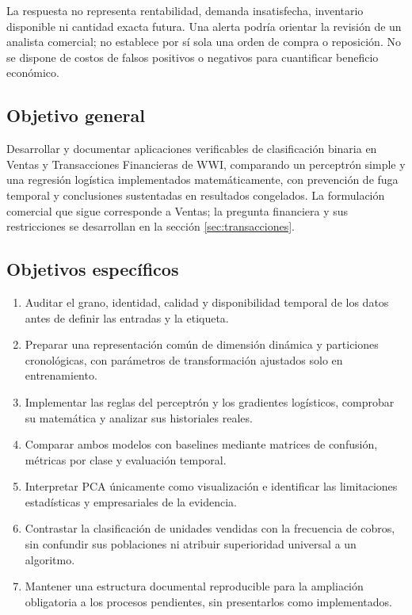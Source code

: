 La respuesta no representa rentabilidad, demanda insatisfecha, inventario disponible ni cantidad exacta futura. Una alerta podría orientar la revisión de un analista comercial; no establece por sí sola una orden de compra o reposición. No se dispone de costos de falsos positivos o negativos para cuantificar beneficio económico.

\subsection{Objetivo general}
Desarrollar y documentar aplicaciones verificables de clasificación binaria en Ventas y Transacciones Financieras de WWI, comparando un perceptrón simple y una regresión logística implementados matemáticamente, con prevención de fuga temporal y conclusiones sustentadas en resultados congelados. La formulación comercial que sigue corresponde a Ventas; la pregunta financiera y sus restricciones se desarrollan en la sección \ref{sec:transacciones}.

\subsection{Objetivos específicos}
\begin{enumerate}
\item Auditar el grano, identidad, calidad y disponibilidad temporal de los datos antes de definir las entradas y la etiqueta.
\item Preparar una representación común de dimensión dinámica y particiones cronológicas, con parámetros de transformación ajustados solo en entrenamiento.
\item Implementar las reglas del perceptrón y los gradientes logísticos, comprobar su matemática y analizar sus historiales reales.
\item Comparar ambos modelos con baselines mediante matrices de confusión, métricas por clase y evaluación temporal.
\item Interpretar PCA únicamente como visualización e identificar las limitaciones estadísticas y empresariales de la evidencia.
\item Contrastar la clasificación de unidades vendidas con la frecuencia de cobros, sin confundir sus poblaciones ni atribuir superioridad universal a un algoritmo.
\item Mantener una estructura documental reproducible para la ampliación obligatoria a los procesos pendientes, sin presentarlos como implementados.
\end{enumerate}
